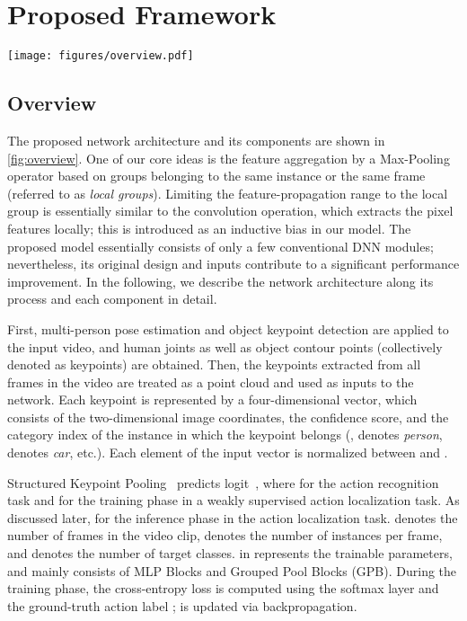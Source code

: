 \documentclass[10pt,twocolumn,letterpaper]{article}
\begin{document}
\section{Proposed Framework}

\begin{figure*}[tb]
  \centering
  \texttt{[image: figures/overview.pdf]}
  \caption{Overview of the Structured Keypoint Pooling network architecture (top) and its original components (bottom).}
  \label{fig:overview}
\end{figure*}

\subsection{Overview}
The proposed network architecture and its components are shown in \cref{fig:overview}.
One of our core ideas is the feature aggregation by a Max-Pooling operator based on groups belonging to the same instance or the same frame (referred to as {\it local groups}).
Limiting the feature-propagation range to the local group is essentially similar to the convolution operation, which extracts the pixel features locally; this is introduced as an inductive bias in our model.
The proposed model essentially consists of only a few conventional DNN modules; nevertheless, its original design and inputs contribute to a significant performance improvement.
In the following, we describe the network architecture along its process and each component in detail.

First, multi-person pose estimation and object keypoint detection are applied to the input video, and human joints as well as object contour points (collectively denoted as keypoints) are obtained.
Then, the keypoints extracted from all frames in the video are treated as a point cloud and used as inputs to the network.
Each keypoint is represented by a four-dimensional vector, which consists of the two-dimensional image coordinates, the confidence score, and the category index of the instance in which the keypoint belongs (\eg,  denotes \textit{person},  denotes \textit{car}, etc.).
Each element of the input vector is normalized between  and .

Structured Keypoint Pooling~ predicts logit~, where  for the action recognition task and for the training phase in a weakly supervised action localization task.
As discussed later,  for the inference phase in the action localization task.
 denotes the number of frames in the video clip,  denotes the number of instances per frame, and  denotes the number of target classes.
 in  represents the trainable parameters, and  mainly consists of MLP Blocks and Grouped Pool Blocks (GPB).
During the training phase, the cross-entropy loss  is computed using the softmax layer and the ground-truth action label ;  is updated via backpropagation.
\end{document}
